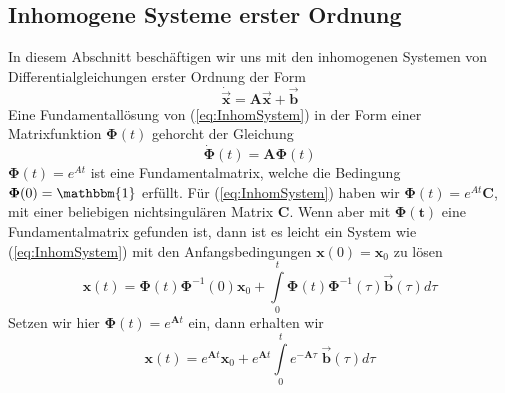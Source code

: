 \subsection{Inhomogene Systeme erster Ordnung}
In diesem Abschnitt beschäftigen wir uns mit den inhomogenen Systemen von
Differentialgleichungen erster Ordnung der Form
\begin{equation}
  \dot{\vec{\mathbf{x}}}=\mathbf{A}\vec{\mathbf{x}}+\vec{\mathbf{b}}
  \label{eq:InhomSystem}
\end{equation}
Eine Fundamentallösung von (\ref{eq:InhomSystem}) in der Form einer
Matrixfunktion $\boldsymbol{\Phi}(t)$ gehorcht der Gleichung 
\begin{equation}
  \dot{\boldsymbol{\Phi}}(t)=\mathbf{A}\boldsymbol{\Phi}(t)
  \label{eq:Fundamentalmatrix}
\end{equation}
$\boldsymbol{\Phi}(t)=e^{At}$ ist eine Fundamentalmatrix, welche die Bedingung
$\boldsymbol{\Phi}(0)=\mathbbm{1}$ erfüllt. Für (\ref{eq:InhomSystem}) haben wir
$\boldsymbol{\Phi}(t)=e^{At}\mathbf{C}$, mit einer beliebigen nichtsingulären
Matrix $\mathbf{C}$.  Wenn aber mit $\boldsymbol{\Phi(t)}$ eine Fundamentalmatrix
gefunden ist, dann ist es leicht ein System wie (\ref{eq:InhomSystem}) mit den
Anfangsbedingungen $\mathbf{x}(0)=\mathbf{x}_0$ zu lösen
\begin{equation}
  \mathbf{x}(t)=\boldsymbol{\Phi}(t)\boldsymbol{\Phi}^{-1}(0)\mathbf{x}_0
  +\int\limits_0^t\boldsymbol{\Phi}(t)\boldsymbol{\Phi}^{-1}(\tau)\vec{\mathbf{b}}(\tau)d\tau
  \label{eq:LoesInhom}
\end{equation}
Setzen wir hier $\boldsymbol{\Phi}(t)=e^{\mathbf{A}t}$ ein, dann erhalten wir
\[ \mathbf{x}(t)=e^{\mathbf{A}t}\mathbf{x}_0
   +e^{\mathbf{A}t}\int\limits_0^te^{-\mathbf{A}\tau}\;\vec{\mathbf{b}}(\tau)d\tau\]

